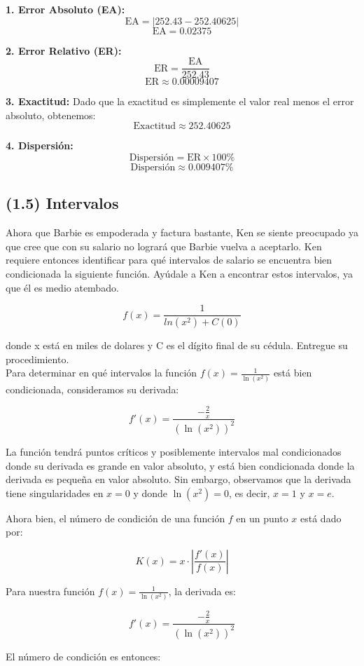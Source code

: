 \textbf{1. Error Absoluto (EA):}
\[ \text{EA} = |252.43 - 252.40625| \]
\[ \text{EA} = 0.02375 \]

\textbf{2. Error Relativo (ER):}
\[ \text{ER} = \frac{\text{EA}}{252.43} \]
\[ \text{ER} \approx 0.00009407 \]

\textbf{3. Exactitud:}
Dado que la exactitud es simplemente el valor real menos el error absoluto, obtenemos:
\[ \text{Exactitud} \approx 252.40625 \]

\textbf{4. Dispersión:}
\[ \text{Dispersión} = \text{ER} \times 100\% \]
\[ \text{Dispersión} \approx 0.009407\% \]


\subsection{(1.5) Intervalos}

Ahora que Barbie es empoderada y factura bastante, Ken se siente preocupado ya que cree que con su salario no logrará que Barbie vuelva a aceptarlo.  Ken requiere entonces identificar para qué intervalos de salario se encuentra bien condicionada la siguiente función. Ayúdale a Ken a encontrar estos intervalos, ya que él es medio atembado.

\[ f(x) = \frac{1}{ln(x^{2}) + C(0)}\]

donde x está en miles de dolares y  C es el dígito final de su cédula. Entregue su procedimiento.
\\

Para determinar en qué intervalos la función \( f(x) = \frac{1}{\ln(x^2)} \) está bien condicionada, consideramos su derivada:

\[ f'(x) = \frac{-\frac{2}{x}}{(\ln(x^2))^2} \]

La función tendrá puntos críticos y posiblemente intervalos mal condicionados donde su derivada es grande en valor absoluto, y está bien condicionada donde la derivada es pequeña en valor absoluto. Sin embargo, observamos que la derivada tiene singularidades en \( x=0 \) y donde \( \ln(x^2) = 0 \), es decir, \( x = 1 \) y \( x = e \).

Ahora bien, el número de condición de una función \( f \) en un punto \( x \) está dado por:

\[ K(x) = x \cdot \left| \frac{f'(x)}{f(x)} \right| \]

Para nuestra función \( f(x) = \frac{1}{\ln(x^2)} \), la derivada es:

\[ f'(x) = \frac{-\frac{2}{x}}{(\ln(x^2))^2} \]

El número de condición es entonces:

